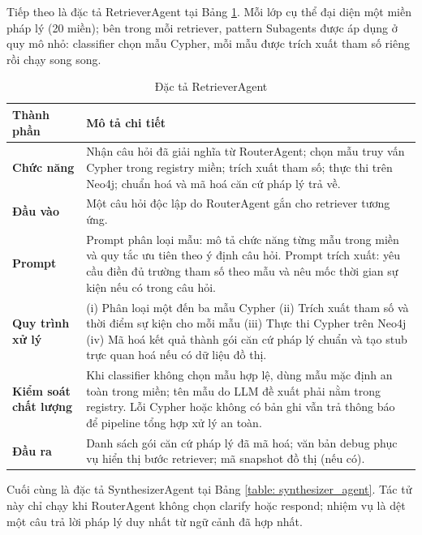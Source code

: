 \documentclass[../DoAn.tex]{subfiles}
\begin{document}
Tiếp theo là đặc tả RetrieverAgent tại Bảng \ref{table: retriever_agent}. Mỗi lớp cụ thể đại diện một miền pháp lý (20 miền); bên trong mỗi retriever, pattern Subagents được áp dụng ở quy mô nhỏ: classifier chọn mẫu Cypher, mỗi mẫu được trích xuất tham số riêng rồi chạy song song.

\begin{table}[H]
\centering
\begin{tabularx}{\textwidth}{|>{\raggedright\arraybackslash}p{3.8cm}|>{\raggedright\arraybackslash}X|}
\hline
\textbf{Thành phần} & \textbf{Mô tả chi tiết} \\ \hline
\textbf{Chức năng} & Nhận câu hỏi đã giải nghĩa từ RouterAgent; chọn mẫu truy vấn Cypher trong registry miền; trích xuất tham số; thực thi trên Neo4j; chuẩn hoá và mã hoá căn cứ pháp lý trả về. \\ \hline
\textbf{Đầu vào} & Một câu hỏi độc lập do RouterAgent gắn cho retriever tương ứng. \\ \hline
\textbf{Prompt} & Prompt phân loại mẫu: mô tả chức năng từng mẫu trong miền và quy tắc ưu tiên theo ý định câu hỏi. Prompt trích xuất: yêu cầu điền đủ trường tham số theo mẫu và nêu mốc thời gian sự kiện nếu có trong câu hỏi. \\ \hline
\textbf{Quy trình xử lý} & (i) Phân loại một đến ba mẫu Cypher (ii) Trích xuất tham số và thời điểm sự kiện cho mỗi mẫu (iii) Thực thi Cypher trên Neo4j (iv) Mã hoá kết quả thành gói căn cứ pháp lý chuẩn và tạo stub trực quan hoá nếu có dữ liệu đồ thị. \\ \hline
\textbf{Kiểm soát chất lượng} & Khi classifier không chọn mẫu hợp lệ, dùng mẫu mặc định an toàn trong miền; tên mẫu do LLM đề xuất phải nằm trong registry. Lỗi Cypher hoặc không có bản ghi vẫn trả thông báo để pipeline tổng hợp xử lý an toàn. \\ \hline
\textbf{Đầu ra} & Danh sách gói căn cứ pháp lý đã mã hoá; văn bản debug phục vụ hiển thị bước retriever; mã snapshot đồ thị (nếu có). \\ \hline
\end{tabularx}
\caption{Đặc tả RetrieverAgent}
\label{table: retriever_agent}
\end{table}

Cuối cùng là đặc tả SynthesizerAgent tại Bảng \ref{table: synthesizer_agent}. Tác tử này chỉ chạy khi RouterAgent không chọn clarify hoặc respond; nhiệm vụ là dệt một câu trả lời pháp lý duy nhất từ ngữ cảnh đã hợp nhất.
\end{document}
